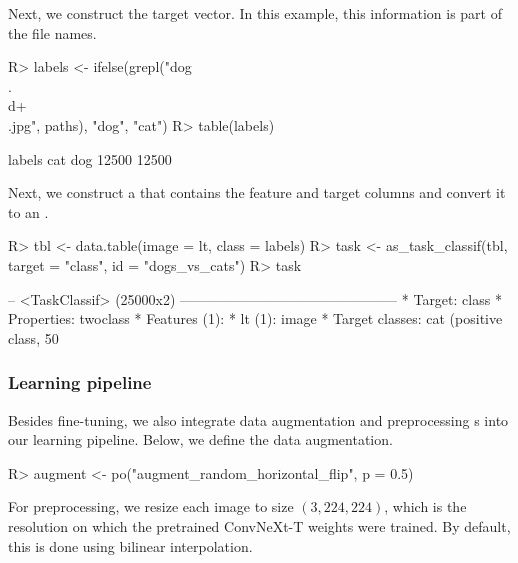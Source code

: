 \documentclass[article,shortnames]{jss}
\theoremstyle{definition}
\renewenvironment{CodeChunk}{\par\addvspace{0.6\baselineskip}\noindent\begin{minipage}{\linewidth}}{\end{minipage}\par\vspace{0.6\baselineskip}}
\begin{document}
Next, we construct the target vector.
In this example, this information is part of the file names.

\begin{CodeChunk}
\begin{CodeInput}
R> labels <- ifelse(grepl("dog\\.\\d+\\.jpg", paths), "dog", "cat")
R> table(labels)
\end{CodeInput}
\begin{CodeOutput}
labels
  cat   dog
12500 12500
\end{CodeOutput}
\end{CodeChunk}

Next, we construct a  \citep{ref-datatable2024} that contains the feature and target columns and convert it to an .

\begin{CodeChunk}
\begin{CodeInput}
R> tbl <- data.table(image = lt, class = labels)
R> task <- as_task_classif(tbl, target = "class", id = "dogs_vs_cats")
R> task
\end{CodeInput}
\begin{CodeOutput}
-- <TaskClassif> (25000x2) -----------------------------------------------
* Target: class
* Properties: twoclass
* Features (1):
  * lt (1): image
* Target classes: cat (positive class, 50%
\end{CodeOutput}
\end{CodeChunk}

\subsubsection{Learning pipeline}

Besides fine-tuning, we also integrate data augmentation and preprocessing s into our learning pipeline.
Below, we define the data augmentation.

\begin{CodeChunk}
\begin{CodeInput}
R> augment <- po("augment_random_horizontal_flip", p = 0.5)
\end{CodeInput}
\end{CodeChunk}

For preprocessing, we resize each image to size $(3, 224, 224)$, which is the resolution on which the pretrained ConvNeXt-T weights were trained.
By default, this is done using bilinear interpolation.
\end{document}

